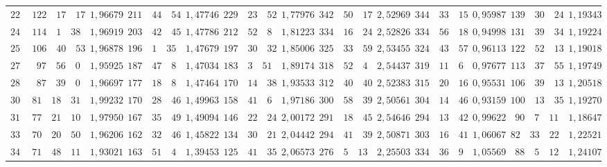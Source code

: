 \begin{landscape}
\begin{center}
\begin{tabular}{r|r|r|r|r|r|r|r|r|r|r|r|r}
\(225\) & \(122\quad 17\quad 17\) & \(1{,}96679\) & \(211\quad 44\quad 54\) & \(1{,}47746\) & \(229\quad 23\quad 52\) & \(1{,}77976\) & \(342\quad 50\quad 17\) & \(2{,}52969\) & \(344\quad 33\quad 15\) & \(0{,}95987\) & \(139\quad 30\quad 24\) & \(1{,}19343\) \\[3pt]
\(240\) & \(114\quad 1\quad 38\) & \(1{,}96919\) & \(203\quad 42\quad 45\) & \(1{,}47786\) & \(212\quad 52\quad 8\) & \(1{,}81223\) & \(334\quad 16\quad 24\) & \(2{,}52826\) & \(334\quad 56\quad 18\) & \(0{,}94998\) & \(131\quad 39\quad 34\) & \(1{,}19224\) \\
\(255\) & \(106\quad 40\quad 53\) & \(1{,}96878\) & \(196\quad 1\quad 35\) & \(1{,}47679\) & \(197\quad 30\quad 32\) & \(1{,}85006\) & \(325\quad 33\quad 59\) & \(2{,}53455\) & \(324\quad 43\quad 57\) & \(0{,}96113\) & \(122\quad 52\quad 13\) & \(1{,}19018\) \\
\(270\) & \(97\quad 56\quad 0\) & \(1{,}95925\) & \(187\quad 47\quad 8\) & \(1{,}47034\) & \(183\quad 3\quad 51\) & \(1{,}89174\) & \(318\quad 52\quad 4\) & \(2{,}54437\) & \(319\quad 11\quad 6\) & \(0{,}97677\) & \(113\quad 37\quad 55\) & \(1{,}19749\) \\
\(285\) & \(87\quad 39\quad 0\) & \(1{,}96697\) & \(177\quad 18\quad 8\) & \(1{,}47464\) & \(170\quad 14\quad 38\) & \(1{,}93533\) & \(312\quad 40\quad 40\) & \(2{,}52383\) & \(315\quad 20\quad 16\) & \(0{,}95531\) & \(106\quad 39\quad 13\) & \(1{,}20518\) \\[3pt]
\(300\) & \(81\quad 18\quad 31\) & \(1{,}99232\) & \(170\quad 28\quad 46\) & \(1{,}49963\) & \(158\quad 41\quad 6\) & \(1{,}97186\) & \(300\quad 58\quad 39\) & \(2{,}50561\) & \(304\quad 14\quad 46\) & \(0{,}93159\) & \(100\quad 13\quad 35\) & \(1{,}19270\) \\
\(315\) & \(77\quad 21\quad 10\) & \(1{,}97950\) & \(167\quad 35\quad 49\) & \(1{,}49094\) & \(146\quad 22\quad 24\) & \(2{,}00172\) & \(291\quad 18\quad 45\) & \(2{,}54646\) & \(294\quad 13\quad 42\) & \(0{,}99622\) & \(90\quad 7\quad 11\) & \(1{,}18647\) \\
\(330\) & \(70\quad 20\quad 50\) & \(1{,}96206\) & \(162\quad 32\quad 46\) & \(1{,}45822\) & \(134\quad 30\quad 21\) & \(2{,}04442\) & \(294\quad 41\quad 39\) & \(2{,}50871\) & \(303\quad 16\quad 41\) & \(1{,}06067\) & \(82\quad 33\quad 22\) & \(1{,}22521\) \\
\(345\) & \(71\quad 48\quad 11\) & \(1{,}93021\) & \(163\quad 51\quad 4\) & \(1{,}39453\) & \(125\quad 41\quad 35\) & \(2{,}06573\) & \(276\quad 5\quad 13\) & \(2{,}25503\) & \(334\quad 36\quad 9\) & \(1{,}05569\) & \(88\quad 5\quad 12\) & \(1{,}24107\) \\

\end{tabular}
\end{center}
\end{landscape}
